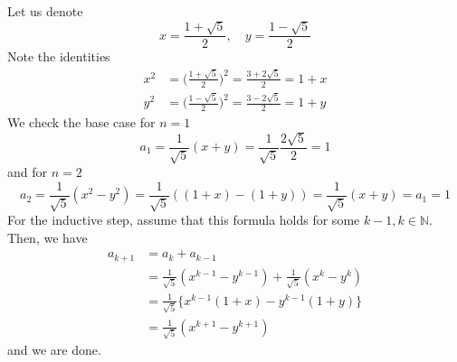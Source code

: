   \begin{exercise}
    Let us denote 
    \begin{equation}
      x = \frac{1 + \sqrt{5}}{2} , \quad y = \frac{1 - \sqrt{5}}{2}
    \end{equation} 
    Note the identities 
    \begin{align}
      x^2 & = \bigg( \frac{1 + \sqrt{5}}{2} \bigg)^2 = \frac{3 + 2 \sqrt{5}}{2} = 1 + x \\
      y^2 & = \bigg( \frac{1 - \sqrt{5}}{2} \bigg)^2 = \frac{3 - 2 \sqrt{5}}{2} = 1 + y
    \end{align}
    We check the base case for $n = 1$
    \begin{equation}
      a_1 = \frac{1}{\sqrt{5}} (x + y) = \frac{1}{\sqrt{5}} \frac{2 \sqrt{5}}{2} = 1
    \end{equation} 
    and for $n = 2$ 
    \begin{equation}
      a_2 = \frac{1}{\sqrt{5}} (x^2 - y^2) = \frac{1}{\sqrt{5}} ((1+x) - (1+y)) = \frac{1}{\sqrt{5}} (x + y) = a_1 = 1
    \end{equation}
    For the inductive step, assume that this formula holds for some $k-1, k \in \mathbb{N}$. Then, we have 
    \begin{align}
      a_{k+1} & = a_{k} + a_{k-1} \\
              & = \frac{1}{\sqrt{5}} (x^{k-1} - y^{k-1}) + \frac{1}{\sqrt{5}} (x^k - y^k) \\
              & = \frac{1}{\sqrt{5}} \big\{ x^{k-1} (1 + x) - y^{k-1} (1 + y)\big\} \\
              & = \frac{1}{\sqrt{5}} (x^{k+1} - y^{k+1})
    \end{align}
    and we are done. 
  \end{exercise}


